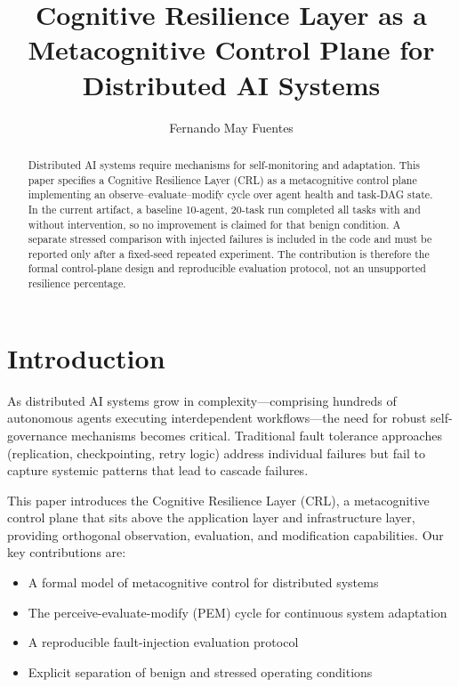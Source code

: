 \documentclass[sigconf]{acmart}
\title{Cognitive Resilience Layer as a Metacognitive Control Plane for Distributed AI Systems}
\author{Fernando May Fuentes}
\affiliation{
  \institution{Instituto Polit\'{e}cnico Nacional}
  \city{Ciudad de M\'{e}xico}
  \country{M\'{e}xico}
}
\begin{document}
\begin{abstract}
Distributed AI systems require mechanisms for self-monitoring and adaptation. This paper specifies a Cognitive Resilience Layer (CRL) as a metacognitive control plane implementing an observe--evaluate--modify cycle over agent health and task-DAG state. In the current artifact, a baseline 10-agent, 20-task run completed all tasks with and without intervention, so no improvement is claimed for that benign condition. A separate stressed comparison with injected failures is included in the code and must be reported only after a fixed-seed repeated experiment. The contribution is therefore the formal control-plane design and reproducible evaluation protocol, not an unsupported resilience percentage.
\end{abstract}


\maketitle

\section{Introduction}

As distributed AI systems grow in complexity—comprising hundreds of autonomous agents executing interdependent workflows—the need for robust self-governance mechanisms becomes critical. Traditional fault tolerance approaches (replication, checkpointing, retry logic) address individual failures but fail to capture systemic patterns that lead to cascade failures.

This paper introduces the Cognitive Resilience Layer (CRL), a metacognitive control plane that sits above the application layer and infrastructure layer, providing orthogonal observation, evaluation, and modification capabilities. Our key contributions are:

\begin{itemize}
\item A formal model of metacognitive control for distributed systems
\item The perceive-evaluate-modify (PEM) cycle for continuous system adaptation
\item A reproducible fault-injection evaluation protocol
\item Explicit separation of benign and stressed operating conditions
\end{itemize}
\end{document}
